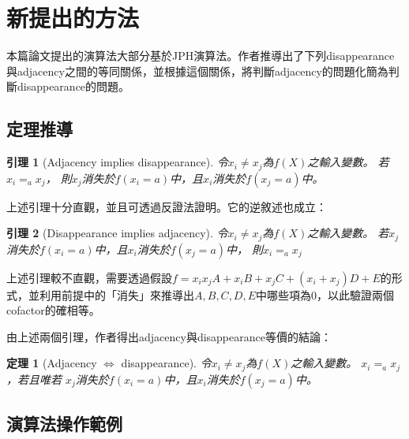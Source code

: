 \documentclass[
  12pt,
  paper=a4,
  ,captions=tableheading
]{scrartcl}
\newtheorem*{thm}{定理}
\newtheorem*{lem}{引理}
\begin{document}
\hypertarget{ux65b0ux63d0ux51faux7684ux65b9ux6cd5}{%
\section{新提出的方法}\label{ux65b0ux63d0ux51faux7684ux65b9ux6cd5}}

本篇論文提出的演算法大部分基於JPH演算法。作者推導出了下列disappearance與adjacency之間的等同關係，並根據這個關係，將判斷adjacency的問題化簡為判斷disappearance的問題。

\hypertarget{ux5b9aux7406ux63a8ux5c0e}{%
\subsection{定理推導}\label{ux5b9aux7406ux63a8ux5c0e}}

\begin{lem}[Adjacency implies disappearance]

令$x_i \neq x_j$為$f(X)$之輸入變數。
若$x_i =_a x_j$，
則$x_j$消失於$f(x_i=a)$中，且$x_i$消失於$f(x_j=a)$中。

\end{lem}

上述引理十分直觀，並且可透過反證法證明。它的逆敘述也成立：

\begin{lem}[Disappearance implies adjacency]

令$x_i \neq x_j$為$f(X)$之輸入變數。
若$x_j$消失於$f(x_i=a)$中，且$x_i$消失於$f(x_j=a)$中，
則$x_i =_a x_j$

\end{lem}

上述引理較不直觀，需要透過假設\(f = x_ix_jA + x_iB + x_jC + (x_i+x_j)D + E\)的形式，並利用前提中的「消失」來推導出\(A,B,C,D,E\)中哪些項為\(0\)，以此驗證兩個cofactor的確相等。

由上述兩個引理，作者得出adjacency與disappearance等價的結論：

\begin{thm}[Adjacency $\Leftrightarrow$ disappearance]

令$x_i \neq x_j$為$f(X)$之輸入變數。
$x_i =_a x_j$，若且唯若
$x_j$消失於$f(x_i=a)$中，且$x_i$消失於$f(x_j=a)$中。

\end{thm}

\hypertarget{ux6f14ux7b97ux6cd5ux64cdux4f5cux7bc4ux4f8b}{%
\subsection{演算法操作範例}\label{ux6f14ux7b97ux6cd5ux64cdux4f5cux7bc4ux4f8b}}
\end{document}
